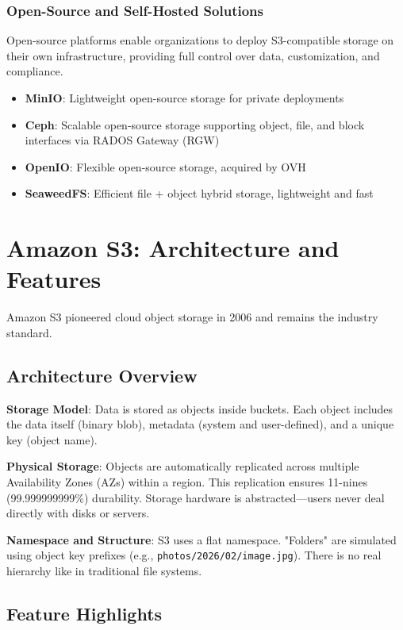 \subsubsection{Open-Source and Self-Hosted Solutions}

Open-source platforms enable organizations to deploy S3-compatible storage on their own infrastructure, providing full control over data, customization, and compliance.

\begin{itemize}
    \item \textbf{MinIO}: Lightweight open-source storage for private deployments
    \item \textbf{Ceph}: Scalable open-source storage supporting object, file, and block interfaces via RADOS Gateway (RGW)
    \item \textbf{OpenIO}: Flexible open-source storage, acquired by OVH
    \item \textbf{SeaweedFS}: Efficient file + object hybrid storage, lightweight and fast
\end{itemize}

\section{Amazon S3: Architecture and Features}\label{sec:s3}

Amazon S3 pioneered cloud object storage in 2006 and remains the industry standard.

\subsection{Architecture Overview}

\textbf{Storage Model}: Data is stored as objects inside buckets. Each object includes the data itself (binary blob), metadata (system and user-defined), and a unique key (object name).

\textbf{Physical Storage}: Objects are automatically replicated across multiple Availability Zones (AZs) within a region. This replication ensures 11-nines (99.999999999\%) durability. Storage hardware is abstracted—users never deal directly with disks or servers.

\textbf{Namespace and Structure}: S3 uses a flat namespace. "Folders" are simulated using object key prefixes (e.g., \texttt{photos/2026/02/image.jpg}). There is no real hierarchy like in traditional file systems.

\subsection{Feature Highlights}

